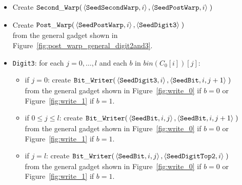 \begin{itemize}
    \item Create
    $\begin{aligned}[t]
        {\tt Second\_Warp}(&\left\langle {\tt SeedSecondWarp}, i  \right\rangle,
                     \left\langle {\tt SeedPostWarp},   i  \right\rangle \;)
    \end{aligned}$

    \item Create
    $\begin{aligned}[t]
        {\tt Post\_Warp}(&\left\langle {\tt SeedPostWarp}, i \right\rangle,
                   \left\langle {\tt SeedDigit3} \right\rangle \;)
    \end{aligned}$\\from the general gadget shown in Figure~\ref{fig:post_warp_general_digit2and3}.


    \item {\tt Digit3}: for each $j=0,\ldots,l$ and each $b$ in $bin(C_0[i])[j]$:
    \begin{itemize}
        \item if $j = 0$: create
        $\begin{aligned}[t]
            {\tt Bit\_Writer}(&\left\langle {\tt SeedDigit3}, i \right\rangle, \left\langle {\tt SeedBit}, i, j + 1 \right\rangle \;)
        \end{aligned}$\\from the general gadget shown in Figure~\ref{fig:write_0} if $b = 0$ or Figure~\ref{fig:write_1} if $b = 1$.

        \item if $0 \leqslant j \leqslant l$: create
        $\begin{aligned}[t]
            {\tt Bit\_Writer}(&\left\langle {\tt SeedBit}, i, j \right\rangle, \left\langle {\tt SeedBit}, i, j + 1 \right\rangle \;)
        \end{aligned}$\\from the general gadget shown in Figure~\ref{fig:write_0} if $b = 0$ or Figure~\ref{fig:write_1} if $b = 1$.

        \item if $j = l$: create
        $\begin{aligned}[t]
            {\tt Bit\_Writer}(&\left\langle {\tt SeedBit}, i, j \right\rangle, \left\langle {\tt SeedDigitTop2}, i \right\rangle \;)
        \end{aligned}$\\from the general gadget shown in Figure~\ref{fig:write_0} if $b = 0$ or Figure~\ref{fig:write_1} if $b = 1$.
    \end{itemize}


\end{itemize}
